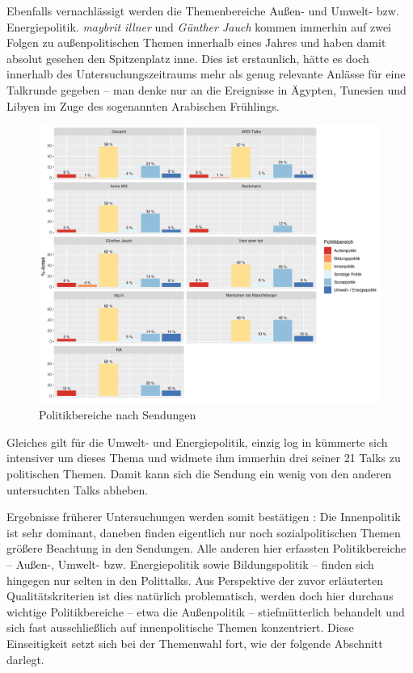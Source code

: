 Ebenfalls vernachlässigt werden die Themenbereiche Außen- und Umwelt- bzw. Energiepolitik. \textit{maybrit illner} und \textit{Günther Jauch} kommen immerhin auf zwei Folgen zu außenpolitischen Themen innerhalb eines Jahres und haben damit absolut gesehen den Spitzenplatz inne. Dies ist erstaunlich, hätte es doch innerhalb des Untersuchungszeitraums mehr als genug relevante Anlässe für eine Talkrunde gegeben – man denke nur an die Ereignisse in Ägypten, Tunesien und Libyen im Zuge des sogenannten Arabischen Frühlings.

\begin{figure}[ht]
	\centering
	\includegraphics[width=1\textwidth]{daten/grafiken/plot_politikbereiche.png}
	\caption{Politikbereiche nach Sendungen}
	\label{plot:politikbereiche}
\end{figure}

Gleiches gilt für die Umwelt- und Energiepolitik, einzig log in kümmerte sich intensiver um dieses Thema und widmete ihm immerhin drei seiner 21 Talks zu politischen Themen. Damit kann sich die Sendung ein wenig von den anderen untersuchten Talks abheben.

Ergebnisse früherer Untersuchungen werden somit bestätigen \parencite[8f.]{muellerSchaubuehneFuerEinflussreichen2006}: Die Innenpolitik ist sehr dominant, daneben finden eigentlich nur noch sozialpolitischen Themen größere Beachtung in den Sendungen. Alle anderen hier erfassten Politikbereiche – Außen-, Umwelt- bzw. Energiepolitik sowie Bildungspolitik – finden sich hingegen nur selten in den Polittalks. Aus Perspektive der zuvor erläuterten Qualitätskriterien ist dies natürlich problematisch, werden doch hier durchaus wichtige Politikbereiche – etwa die Außenpolitik – stiefmütterlich behandelt und sich fast ausschließlich auf innenpolitische Themen konzentriert. Diese Einseitigkeit setzt sich bei der Themenwahl fort, wie der folgende Abschnitt darlegt.

